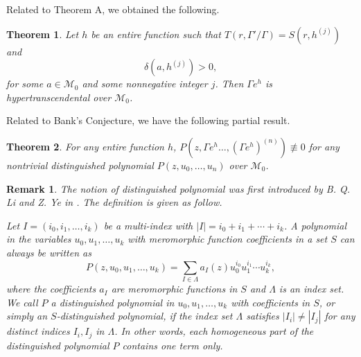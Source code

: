 \documentclass[reqno,12pt]{amsart}
\newtheorem{thm}{Theorem}
\newtheorem{rmk}{Remark}
\begin{document}
Related to Theorem A, we obtained the following. 

\begin{thm}\label{cor:Bank} Let $h$ be an entire function such that $T(r, \Gamma'/\Gamma)=S(r, h^{(j)})$ and 
\begin{equation}\label{eqn:hj}
\delta(a, h^{(j)})>0,
\end{equation}  for some $a\in\mathcal{M}_0$ and some nonnegative integer $j$. Then
$\Gamma e^h$ is hypertranscendental over $\mathcal{M}_0$.
\end{thm}



Related to Bank's Conjecture, we have the following partial result.

\begin{thm}\label{cor:Bank2} For any entire function $h$, $P(z, \Gamma e^h \dots, (\Gamma e^h)^{(n)})\not\equiv 0$ for any nontrivial distinguished polynomial $P(z, u_0, \dots, u_n)$ over $\mathcal{M}_0$.
\end{thm}

\begin{rmk} The notion of distinguished polynomial was first introduced by B. Q. Li and Z. Ye in \cite{LY16}. The definition is given as follow. 

 Let $I=(i_0, i_1, \dots, i_k)$ be a multi-index with $|I|=i_0+i_1+\cdots+i_k$. A polynomial in the variables $u_0, u_1, \dots, u_k$ with meromorphic function coefficients in a set $S$ can always be written as $$P(z, u_0, u_1, \dots, u_k)=\sum_{I\in\Lambda}a_I(z)u_0^{i_0}u_1^{i_1}\cdots u_k^{i_k},$$ where the coefficients $a_I$ are meromorphic functions in $S$ and $\Lambda$ is an index set. 
 We call $P$ a \emph{distinguished polynomial} in $u_0, u_1, \dots, u_k$ with coefficients in $S$, or simply an \emph{$S$-distinguished polynomial}, if the index set $\Lambda$ satisfies $|I_i|\neq |I_j|$ for any distinct indices $I_i, I_j$ in $\Lambda$. In other words, each homogeneous part of the distinguished polynomial $P$ contains one term only.

\end{rmk}

\end{document}
